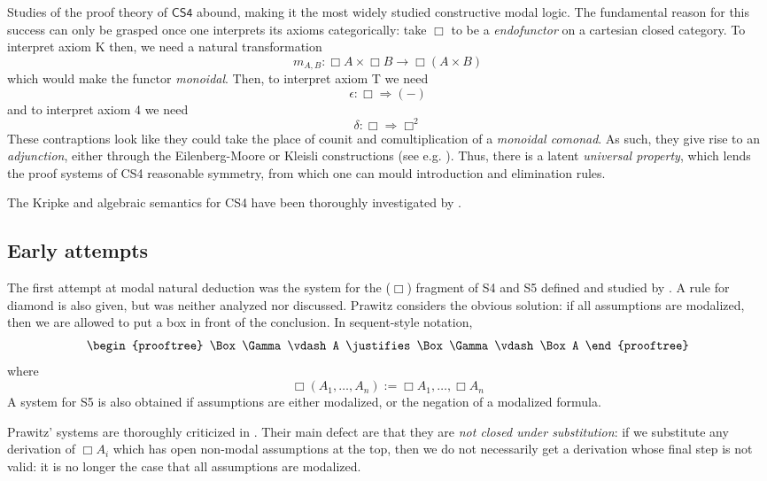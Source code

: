 \documentclass[a4paper]{amsart}
\begin{document}
Studies of the proof theory of $\mathsf{CS4}$ abound, making it
the most widely studied constructive modal logic. The fundamental
reason for this success can only be grasped once one interprets
its axioms categorically: take $\Box$ to be a \emph{endofunctor}
on a cartesian closed category. To interpret axiom \textsf{K}
then, we need a natural transformation \[
  m_{A, B} : \Box A \times \Box B \rightarrow \Box (A \times B)
\] which would make the functor \emph{monoidal}. Then, to
interpret axiom \textsf{T} we need \[
  \epsilon : \Box \Rightarrow (-)
\] and to interpret axiom \textsf{4} we need \[
  \delta : \Box \Rightarrow \Box^2
\] These contraptions look like they could take the place of
counit and comultiplication of a \emph{monoidal comonad}. As such,
they give rise to an \emph{adjunction}, either through the
Eilenberg-Moore or Kleisli constructions (see e.g.
\cite{Awodey2010}).  Thus, there is a latent \emph{universal
property}, which lends the proof systems of \textsf{CS4}
reasonable symmetry, from which one can mould introduction and
elimination rules.

The Kripke and algebraic semantics for \textsf{CS4} have been
thoroughly investigated by \cite{Alechina2001}.

\subsection{Early attempts}

The first attempt at modal natural deduction was the system for
the ($\Box$) fragment of \textsf{S4} and \textsf{S5} defined and
studied by \cite{Prawitz1965}. A rule for diamond is also given,
but was neither analyzed nor discussed. Prawitz considers
the obvious solution: if all assumptions are modalized, then we
are allowed to put a box in front of the conclusion. In
sequent-style notation, \[ \begin{prooftree}
  \Box\Gamma \vdash A
    \justifies
  \Box\Gamma \vdash \Box A
\end{prooftree} \] where \[
  \Box(A_1, \dots, A_n) := \Box A_1, \dots, \Box A_n
\] A system for \textsf{S5} is also obtained if assumptions are
either modalized, or the negation of a modalized formula.

Prawitz' systems are thoroughly criticized in \citep{Bierman2000a}.
Their main defect are that they are \emph{not closed under
substitution}: if we substitute any derivation of $\Box A_i$ which
has open non-modal assumptions at the top, then we do not
necessarily get a derivation whose final step is not valid: it
is no longer the case that all assumptions are modalized. 
\end{document}
